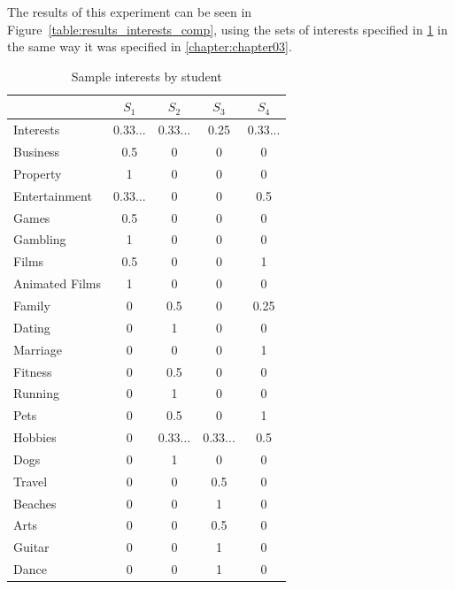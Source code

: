 The results of this experiment can be seen in Figure~\ref{table:results_interests_comp}, using the sets of interests specified in \ref{table:sample_interests} in the same way it was specified in \ref{chapter:chapter03}.\\

\begin{table}[]
\centering
\begin{tabular}{lcccc}
\hline
               & $S_1$      & $S_2$      & $S_3$      & $S_4$      \\ \hline
Interests      & 0.33... & 0.33... & 0.25    & 0.33... \\
Business       & 0.5     & 0       & 0       & 0       \\
Property       & 1       & 0       & 0       & 0       \\
Entertainment  & 0.33... & 0       & 0       & 0.5     \\
Games          & 0.5     & 0       & 0       & 0       \\
Gambling       & 1       & 0       & 0       & 0       \\
Films          & 0.5     & 0       & 0       & 1       \\
Animated Films & 1       & 0       & 0       & 0       \\
Family         & 0       & 0.5     & 0       & 0.25    \\
Dating         & 0       & 1       & 0       & 0       \\
Marriage       & 0       & 0       & 0       & 1       \\
Fitness        & 0       & 0.5     & 0       & 0       \\
Running        & 0       & 1       & 0       & 0       \\
Pets           & 0       & 0.5     & 0       & 1       \\
Hobbies        & 0       & 0.33... & 0.33... & 0.5     \\
Dogs           & 0       & 1       & 0       & 0       \\
Travel         & 0       & 0       & 0.5     & 0       \\
Beaches        & 0       & 0       & 1       & 0       \\
Arts           & 0       & 0       & 0.5     & 0       \\
Guitar         & 0       & 0       & 1       & 0       \\
Dance          & 0       & 0       & 1       & 0       \\ \hline
    \end{tabular}
    \caption{Sample interests by student}
    \label{table:sample_interests}
\end{table}

